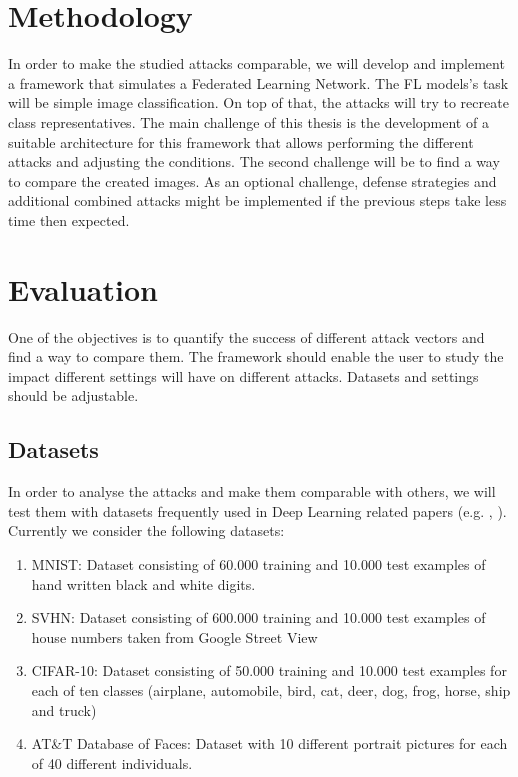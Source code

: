 \documentclass[
	ngerman,
	ruledheaders=section,%
	class=report,%
	thesis={type=bachelor},%
	accentcolor=1b,%
	custommargins=true,%
	marginpar=false,%
	parskip=half-,%
	fontsize=11pt,%
]{tudapub}
\begin{document}
\chapter{Methodology}\label{sec:methodology}
In order to make the studied attacks comparable, we will develop and implement a framework that simulates a Federated Learning Network. The FL models's task will be simple image classification. On top of that, the attacks will try to recreate class representatives. The main challenge of this thesis is the development of a suitable architecture for this framework that allows performing the different attacks and adjusting the conditions. The second challenge will be to find a way to compare the created images. As an optional challenge, defense strategies and additional combined attacks might be implemented if the previous steps take less time then expected.







\chapter{Evaluation}\label{sec:evaluation}
One of the objectives is to quantify the success of different attack vectors and find a way to compare them. The framework should enable the user to study the impact different settings will have on different attacks. Datasets and settings should be adjustable.




\section{Datasets}
In order to analyse the attacks and make them comparable with others, we will test them with datasets frequently used in Deep Learning related papers (e.g. \cite{shokri2015privacy}, \cite{zhu2019deep}). Currently we consider the following datasets:
\begin{enumerate}
    \item MNIST: Dataset consisting of 60.000 training and 10.000 test examples of hand written black and white digits.
    \item SVHN: Dataset consisting of 600.000 training and 10.000 test examples of house numbers taken from Google Street View
    \item CIFAR-10: Dataset consisting of 50.000 training and 10.000 test examples for each of ten classes (airplane, automobile, bird, cat, deer, dog, frog, horse, ship and truck)
    \item AT\&T Database of Faces: Dataset with 10 different portrait pictures for each of 40 different individuals.
\end{enumerate}
\end{document}
